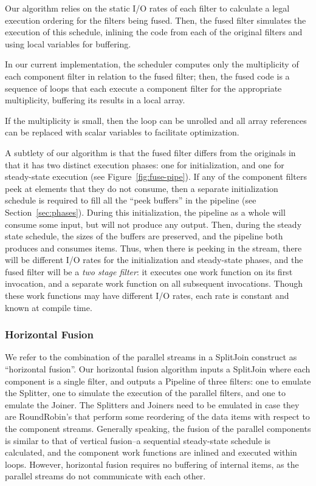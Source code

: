 Our algorithm relies on the static I/O rates of each filter to
calculate a legal execution ordering for the filters being fused.
Then, the fused filter simulates the execution of this schedule,
inlining the code from each of the original filters and using local
variables for buffering.  

In our current implementation, the scheduler computes only the
multiplicity of each component filter in relation to the fused filter;
then, the fused code is a sequence of loops that each execute a
component filter for the appropriate multiplicity, buffering its
results in a local array.

If the multiplicity is small, then the loop can be unrolled and all
array references can be replaced with scalar variables to facilitate
optimization.

A subtlety of our algorithm is that the fused filter differs from the
originals in that it has two distinct execution phases: one for
initialization, and one for steady-state execution (see
Figure~\ref{fig:fuse-pipe}).  If any of the component filters peek at
elements that they do not consume, then a separate initialization
schedule is required to fill all the ``peek buffers'' in the pipeline
(see Section~\ref{sec:phases}).  During this initialization, the
pipeline as a whole will consume some input, but will not produce any
output.  Then, during the steady state schedule, the sizes of the
buffers are preserved, and the pipeline both produces and consumes
items.  Thus, when there is peeking in the stream, there will be
different I/O rates for the initialization and steady-state phases,
and the fused filter will be a {\it two stage filter}: it executes one
work function on its first invocation, and a separate work function on
all subsequent invocations.  Though these work functions may have
different I/O rates, each rate is constant and known at compile time.

\subsubsection{Horizontal Fusion}

We refer to the combination of the parallel streams in a SplitJoin
construct as ``horizontal fusion''.  Our horizontal fusion algorithm
inputs a SplitJoin where each component is a single filter, and
outputs a Pipeline of three filters: one to emulate the Splitter, one
to simulate the execution of the parallel filters, and one to emulate
the Joiner.  The Splitters and Joiners need to be emulated in case
they are RoundRobin's that perform some reordering of the data items
with respect to the component streams.  Generally speaking, the fusion
of the parallel components is similar to that of vertical fusion--a
sequential steady-state schedule is calculated, and the component work
functions are inlined and executed within loops.  However, horizontal
fusion requires no buffering of internal items, as the parallel
streams do not communicate with each other.


